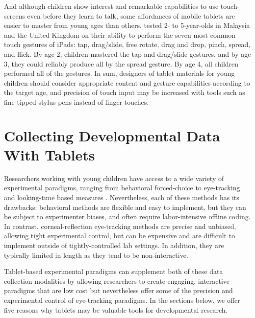 \documentclass[man,noapacite]{apa2}
\begin{document}
And although children show interest and remarkable capabilities to use touch-screens even before they learn to talk, some affordances of mobile tablets are easier to master from young ages than others.  tested 2- to 5-year-olds in Malaysia and the United Kingdom on their ability to perform the seven most common touch gestures of iPads: tap, drag/slide, free rotate, drag and drop, pinch, spread, and flick. By age 2, children mastered the tap and drag/slide gestures, and by age 3, they could reliably produce all by the spread gesture. By age 4, all children performed all of the gestures. In sum, designers of tablet materials for young children should consider appropriate content and gesture capabilities according to the target age, and precision of touch input may be increased with tools such as fine-tipped stylus pens instead of finger touches.

\section{Collecting Developmental Data With Tablets}

Researchers working with young children have access to a wide variety of experimental paradigms, ranging from behavioral forced-choice to eye-tracking and looking-time based measures \cite{aslin2007,gredeback2009}. Nevertheless, each of these methods has its drawbacks: behavioral methods are flexible and easy to implement, but they can be subject to experimenter biases, and often require labor-intensive offline coding. In contrast, corneal-reflection eye-tracking methods are precise and unbiased, allowing tight experimental control, but can be expensive and are difficult to implement outside of tightly-controlled lab settings. In addition, they are typically limited in length as they tend to be non-interactive.

Tablet-based experimental paradigms can supplement both of these data collection modalities by allowing researchers to create engaging, interactive paradigms that are low cost but nevertheless offer some of the precision and experimental control of eye-tracking paradigms. In the sections below, we offer five reasons why tablets may be valuable tools for developmental research.
\end{document}
